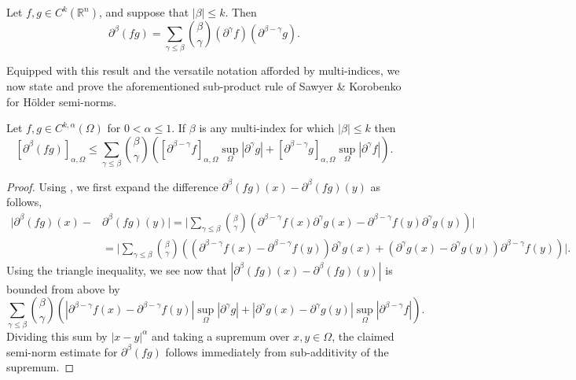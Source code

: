 \documentclass[oneside,hidelinks,indentfirst,10pt]{book}
\begin{document}
\begin{lem}\label{lem:Leib}
Let \(f,g\in C^k(\mathbb{R}^n)\), and suppose that \(|\beta|\leq k\). Then
\[
    \partial^\beta(fg)=\sum_{\gamma\leq\beta}\binom{\beta}{\gamma}(\partial^\gamma f)(\partial^{\beta-\gamma}g).
\]
\end{lem}


Equipped with this result and the versatile notation afforded by multi-indices, we now state and prove the aforementioned sub-product rule of Sawyer \& Korobenko for H\"older semi-norms.


\begin{lem}\label{lem:subprod}
Let \(f,g\in C^{k,\alpha}(\Omega)\) for \(0<\alpha\leq 1\). If \(\beta\) is any multi-index for which \(|\beta|\leq k\) then 
\[
    [\partial^\beta(fg)]_{\alpha,\Omega}\leq\sum_{\gamma\leq\beta}\binom{\beta}{\gamma}([\partial^{\beta-\gamma}f]_{\alpha,\Omega}\sup_{\Omega}|\partial^\gamma g|+[\partial^{\beta-\gamma}g]_{\alpha,\Omega}\sup_{\Omega}|\partial^\gamma f|).
\]
\end{lem}


\begin{proof}
Using , we first expand the difference \(\partial^\beta(fg)(x)-\partial^\beta(fg)(y)\) as follows,
\begin{align*}
    |\partial^\beta(fg)(x)-&\partial^\beta(fg)(y)|=\bigg|\sum_{\gamma\leq\beta}\binom{\beta}{\gamma}(\partial^{\beta-\gamma}f(x)\partial^\gamma g(x)-\partial^{\beta-\gamma}f(y)\partial^\gamma g(y))\bigg|\\
    &=\bigg|\sum_{\gamma\leq\beta}\binom{\beta}{\gamma}((\partial^{\beta-\gamma}f(x)-\partial^{\beta-\gamma}f(y))\partial^\gamma g(x)+(\partial^\gamma g(x)-\partial^\gamma g(y))\partial^{\beta-\gamma} f(y))\bigg|.
\end{align*}
Using the triangle inequality, we see now that \(|\partial^\beta(fg)(x)-\partial^\beta(fg)(y)|\) is bounded from above by
\[
    \sum_{\gamma\leq\beta}\binom{\beta}{\gamma}(|\partial^{\beta-\gamma}f(x)-\partial^{\beta-\gamma}f(y)|\sup_\Omega|\partial^\gamma g|+|\partial^\gamma g(x)-\partial^\gamma g(y)|\sup_\Omega|\partial^{\beta-\gamma} f|).
\]
Dividing this sum by \(|x-y|^\alpha\) and taking a supremum over \(x,y\in\Omega\), the claimed semi-norm estimate for \(\partial^\beta(fg)\) follows immediately from sub-additivity of the supremum. 
\end{proof}
\end{document}
